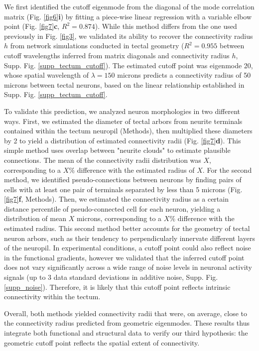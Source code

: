 \documentclass{article}
\begin{document}
We first identified the cutoff eigenmode from the diagonal of the mode correlation matrix (Fig. \ref{fig6}\textbf{i}) by fitting a piece-wise linear regression with a variable elbow point (Fig. \ref{fig7}\textbf{c}, $R^2=0.874$). While this method differs from the one used previously in Fig. \ref{fig3}, we validated its ability to recover the connectivity radius $h$ from network simulations conducted in tectal geometry ($R^2=0.955$ between cutoff wavelengths inferred from matrix diagonals and connectivity radius $h$, Supp. Fig. \ref{supp_tectum_cutoff}). The estimated cutoff point was eigenmode 20, whose spatial wavelength of $\lambda=150$ microns predicts a connectivity radius of 50 microns between tectal neurons, based on the linear relationship established in Supp. Fig. \ref{supp_tectum_cutoff}. 

To validate this prediction, we analyzed neuron morphologies in two different ways. First, we estimated the diameter of tectal arbors from neurite terminals contained within the tectum neuropil (Methods), then multiplied these diameters by 2 to yield a distribution of estimated connectivity radii (Fig. \ref{fig7}\textbf{d}). This simple method uses overlap between "neurite clouds" to estimate plausible connections. The mean of the connectivity radii distribution was $X$, corresponding to a $X\%$ difference with the estimated radius of $X$. For the second method, we identified pseudo-connections between neurons by finding pairs of cells with at least one pair of terminals separated by less than 5 microns (Fig. \ref{fig7}\textbf{f}, Methods). Then, we estimated the connectivity radius as a certain distance percentile of pseudo-connected cell for each neuron, yielding a distribution of mean $X$ microns, corresponding to a $X\%$ difference with the estimated radius. This second method better accounts for the geometry of tectal neuron arbors, such as their tendency to perpendicularly innervate different layers of the neuropil. In experimental conditions, a cutoff point could also reflect noise in the functional gradients, however we validated that the inferred cutoff point does not vary significantly across a wide range of noise levels in neuronal activity signals (up to 3 data standard deviations in additive noise, Supp. Fig. \ref{supp_noise}). Therefore, it is likely that this cutoff point reflects intrinsic connectivity within the tectum.

Overall, both methods yielded connectivity radii that were, on average, close to the connectivity radius predicted from geometric eigenmodes. These results thus integrate both functional and structural data to verify our third hypothesis: the geometric cutoff point reflects the spatial extent of connectivity.
\end{document}
